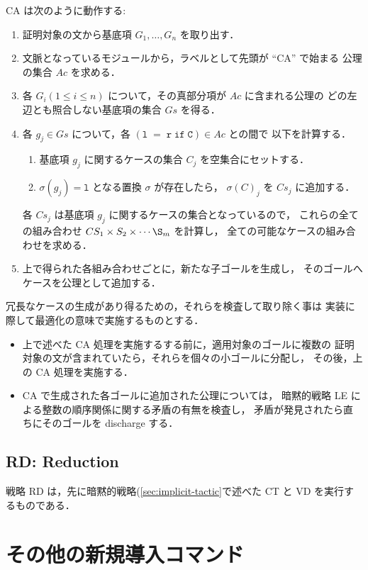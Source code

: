 \documentclass[a4paper,oneside,10pt,here]{memoir}
\begin{document}
CA は次のように動作する:
\begin{enumerate}
\item 証明対象の文から基底項 $G_1, \ldots, G_n$ を取り出す．
\item 文脈となっているモジュールから，ラベルとして先頭が ``CA'' で始まる
  公理の集合 $Ac$ を求める．
\item 各 $G_i (1\le i \le n)$ について，その真部分項が $Ac$ に含まれる公理の
  どの左辺とも照合しない基底項の集合 $Gs$ を得る．
\item 各 $g_j \in Gs$ について，各 $(\mathtt{l\; =\; r\; if\; C}) \in Ac$ との間で
  以下を計算する．
  \begin{enumerate}
  \item 基底項 $g_j$ に関するケースの集合 $C_j$ を空集合にセットする．
  \item $\sigma(g_j) = \mathtt{l}$ となる置換 $\sigma$ が存在したら，
    $\sigma(C)_j$ を $Cs_j$ に追加する．
  \end{enumerate}
  各 $Cs_j$ は基底項 $g_j$ に関するケースの集合となっているので，
  これらの全ての組み合わせ $CS_1 \times S_2 \times \cdots\S_m$ を計算し，
  全ての可能なケースの組み合わせを求める．
  \item 上で得られた各組み合わせごとに，新たな子ゴールを生成し，
    そのゴールへケースを公理として追加する．
\end{enumerate}
冗長なケースの生成があり得るための，それらを検査して取り除く事は
実装に際して最適化の意味で実施するものとする．

\begin{itemize}
\item 上で述べた CA 処理を実施するする前に，適用対象のゴールに複数の
  証明対象の文が含まれていたら，それらを個々の小ゴールに分配し，
  その後，上の CA 処理を実施する．
\item CA で生成された各ゴールに追加された公理については，
  暗黙的戦略 LE による整数の順序関係に関する矛盾の有無を検査し，
  矛盾が発見されたら直ちにそのゴールを discharge する．
\end{itemize}

\subsection{RD: Reduction}\label{sec:RD}

戦略 RD は，先に暗黙的戦略(\ref{sec:implicit-tactic}で述べた CT と VD を実行するものである．

\section{その他の新規導入コマンド}\label{sec:other-commands}
\end{document}

